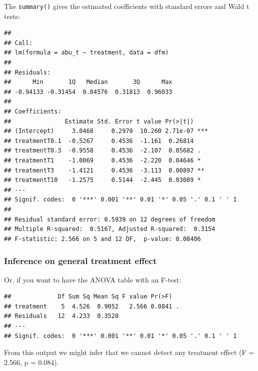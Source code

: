 The \texttt{summary()} gives the estimated coefficients with standard errors and Wald t tests:
\begin{knitrout}
\color{fgcolor}\begin{kframe}
\begin{alltt}
\end{alltt}
\begin{verbatim}
## 
## Call:
## lm(formula = abu_t ~ treatment, data = dfm)
## 
## Residuals:
##      Min       1Q   Median       3Q      Max 
## -0.94133 -0.31454  0.04576  0.31813  0.96033 
## 
## Coefficients:
##               Estimate Std. Error t value Pr(>|t|)    
## (Intercept)     3.0468     0.2970  10.260 2.71e-07 ***
## treatmentT0.1  -0.5267     0.4536  -1.161  0.26814    
## treatmentT0.3  -0.9558     0.4536  -2.107  0.05682 .  
## treatmentT1    -1.0069     0.4536  -2.220  0.04646 *  
## treatmentT3    -1.4121     0.4536  -3.113  0.00897 ** 
## treatmentT10   -1.2575     0.5144  -2.445  0.03089 *  
## ---
## Signif. codes:  0 '***' 0.001 '**' 0.01 '*' 0.05 '.' 0.1 ' ' 1
## 
## Residual standard error: 0.5939 on 12 degrees of freedom
## Multiple R-squared:  0.5167,	Adjusted R-squared:  0.3154 
## F-statistic: 2.566 on 5 and 12 DF,  p-value: 0.08406
\end{verbatim}
\end{kframe}
\end{knitrout}

\subsubsection{Inference on general treatment effect}
Or, if you want to have the ANOVA table with an F-test:
\begin{knitrout}
\color{fgcolor}\begin{kframe}
\begin{alltt}
\end{alltt}
\begin{verbatim}
##             Df Sum Sq Mean Sq F value Pr(>F)  
## treatment    5  4.526  0.9052   2.566 0.0841 .
## Residuals   12  4.233  0.3528                 
## ---
## Signif. codes:  0 '***' 0.001 '**' 0.01 '*' 0.05 '.' 0.1 ' ' 1
\end{verbatim}
\end{kframe}
\end{knitrout}

From this output we might infer that we cannot detect any treatment effect (F = 2.566, p = 0.084).

